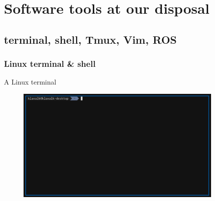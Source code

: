 \documentclass[aspectratio=1610]{beamer}
\begin{document}

  \section{Software tools at our disposal}
  \subsection{terminal, shell, Tmux, Vim, ROS}


  \begin{frame}
    \frametitle{Linux terminal \& shell}

    \begin{block}{A Linux terminal}
      \begin{figure}
        \includegraphics[width=0.9\textwidth]{fig/terminal.png}
      \end{figure}
    \end{block}

  \end{frame}


\end{document}
